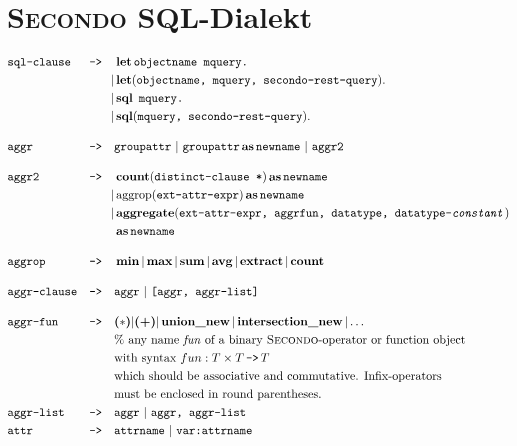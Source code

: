 %
%
%

\chapter{\textsc{Secondo} SQL-Dialekt}

\begin{align*}
&\texttt{sql-clause} &\texttt{-->}\quad &\op{let} \texttt{objectname mquery.}\\
&&|&\op{let}(\texttt{objectname, mquery, secondo-rest-query}).\\
&&|&\op{sql}\ \texttt{mquery.}\\
&&|&\op{sql}(\texttt{mquery, secondo-rest-query}).\\[1em]
&\texttt{aggr} &\texttt{-->}\quad &\texttt{groupattr}\ |\ \texttt{groupattr} \op{as} \texttt{newname}\ |\ \texttt{aggr2}\\[1em]
&\texttt{aggr2} &\texttt{-->}\quad &\op{count}(\texttt{distinct-clause *}) \op{as} \texttt{newname}\\
&&|&\operatorname{aggrop}(\texttt{ext-attr-expr}) \op{as} \texttt{newname}\\
&&|&\op{aggregate}(\texttt{ext-attr-expr, aggrfun, datatype, datatype-\textit{constant}})\\
&&&\op{as} \texttt{newname}\\[1em]
&\texttt{aggrop} &\texttt{-->}\quad &\op{min}|\op{max}|\op{sum}|\op{avg}|\op{extract}|\op{count}\\[1em]
&\texttt{aggr-clause} &\texttt{-->}\quad &\texttt{aggr}\ |\ \texttt{[aggr, aggr-list]}\\[1em]
&\texttt{aggr-fun} &\texttt{-->}\quad &\textbf{(\begin{math}*\end{math})} |\textbf{(+)}| \op{union\_new}|\op{intersection\_new}|\dots\\
&&&\text{\% any name \textit{fun} of a binary \textsc{Secondo}-operator or function object}\\
&&&\text{with syntax}\ fun:T \times T\operatorname{\texttt{-->}}T\\
&&&\text{which should be associative and commutative. Infix-operators}\\
&&&\text{must be enclosed in round parentheses.}\\
&\texttt{aggr-list} &\texttt{-->}\quad &\texttt{aggr}\ |\ \texttt{aggr, aggr-list}\\
&\texttt{attr} &\texttt{-->}\quad &\texttt{attrname}\ |\ \texttt{var:attrname}
\end{align*}

%
%
%